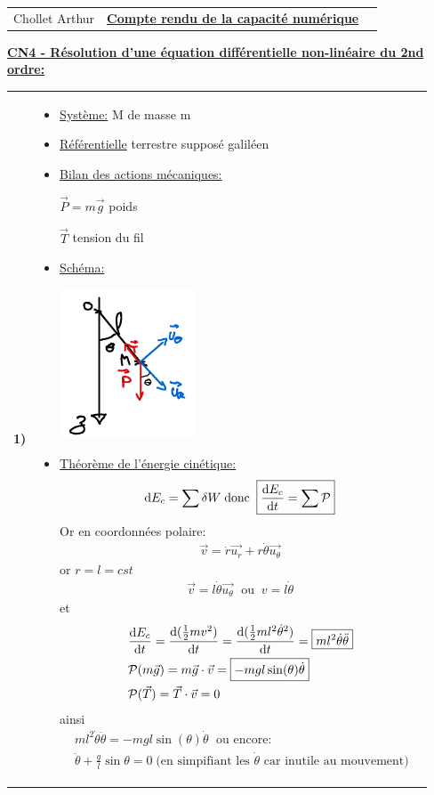 \documentclass{article}
\newcommand{\question}[2]
{
    \begin{tabularx}{\linewidth}{lX}
        \textbf{#1)} & {#2}
    \end{tabularx} 
}
\newcommand{\expart}[1]
{
    \textbf{\underline{#1:}} \par 
}
\newcommand{\txt}[1]{
    \;\text{#1}\;\;
}
\begin{document}
\begin{tabularx}{\linewidth}{XCX}
    Chollet Arthur &\textbf{\underline{Compte rendu de la capacité numérique}}& 
\end{tabularx}

\expart{CN4 - Résolution d'une équation différentielle non-linéaire du 2nd ordre}
{
    \question{1}{
      \begin{itemize}
        \item \underline{Système:} M de masse m
        \item \underline{Référentielle} terrestre supposé galiléen
        \item \underline{Bilan des actions mécaniques:}
        
        $\vec{P}=m\vec{g}$ poids

        $\vec{T}$ tension du fil
        \item \underline{Schéma:}
        \begin{center}
          \includegraphics[height=12em]{images/CN4_schema.png}
        \end{center}

        \item \underline{Théorème de l'énergie cinétique:}
        \begin{align*}
          \dd E_c=\sum\delta W \txt{donc} \boxed{\dv{E_c}{t}=\sum\mathcal{P}}
        \end{align*} 
        Or en coordonnées polaire: \begin{align*}
          \vec{v}=\dot{r}\vec{u_r}+r\dot{\theta}\vec{u_{\theta}}
        \end{align*} 
        or $r=l=cst$ \begin{align*}
          \boxed{\vec{v}=l\dot{\theta}\vec{u_{\theta}} \txt{ ou} v=l\dot{\theta}}
        \end{align*}
        et \begin{align*}
          &\dv{E_c}{t}=\dv{(\frac{1}{2}mv^2)}{t}=\dv{(\frac{1}{2}ml^2\dot{\theta}^2)}{t}=\boxed{ml^2\dot{\theta}\ddot{\theta}}\\
          &\mathcal{P}(m\vec{g})=m\vec{g}\cdot\vec{v}=\boxed{-mgl\sin(\theta)\dot{\theta}}\\
          &\mathcal{P}(\vec{T})=\vec{T}\cdot\vec{v}=0
        \end{align*}
        ainsi \begin{align*}
          &ml^2\dot{\theta}\ddot{\theta}=-mgl\sin(\theta)\dot{\theta} \txt{ ou encore:}\\
          &\boxed{\ddot{\theta}+\frac{g}{l}\sin\theta=0} \txt{(en simpifiant les $\dot{\theta}$ car inutile au mouvement)}
        \end{align*}
      \end{itemize}
    }

}
\end{document}
